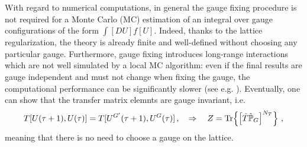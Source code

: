 \documentclass{article}
\begin{document}
With regard to numerical computations, in general the gauge fixing procedure is not required for a Monte Carlo (MC) estimation of an integral over gauge configurations of the form $\int [D U] f[U]$. Indeed, thanks to the lattice regularization, the theory is already finite and well-defined without choosing any particular gauge. Furthermore, gauge fixing introduces long-range interactions which are not well simulated by a local MC algorithm: even if the final results are gauge independent and must not change when fixing the gauge, the computational performance can be significantly slower (see e.g. \cite{Creutz:1980zw,Vladikas:1985uv}). Eventually, one can show \cite{Della_Morte_2009} that the transfer matrix elemnts are gauge invariant, i.e. 
\begin{equation}
    T[U(\tau+1), U(\tau)] = T[U^{G'}(\tau+1), U^G(\tau)] \, , \quad \Rightarrow \quad Z = \Tr \! \left\{ \left[ \hat{T} \hat{\mathbb{P}}_G \right]^{N_T} \right\} \, ,
\end{equation}
meaning that there is no need to choose a gauge on the lattice. 



\printbibliography
\end{document}
